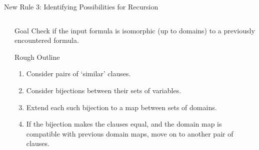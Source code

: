 \documentclass{beamer}
\begin{document}
\begin{frame}{New Rule 3: Identifying Possibilities for Recursion}
  \begin{columns}
    \begin{column}{0.25\textwidth}
      \centering
    \end{column}
    \begin{column}{0.75\textwidth}
      \begin{block}{Goal}
      Check if the input formula is isomorphic (up to domains) to a previously encountered formula.
      \end{block}
      \begin{block}{Rough Outline}
        \begin{enumerate}
        \item Consider pairs of `similar' clauses.
        \item Consider bijections between their sets of variables.
        \item Extend each such bijection to a map between sets of domains.
        \item If the bijection makes the clauses equal, and the domain map is compatible with previous domain maps, move on to another pair of clauses.
        \end{enumerate}
      \end{block}
    \end{column}
  \end{columns}
\end{frame}

\end{document}

